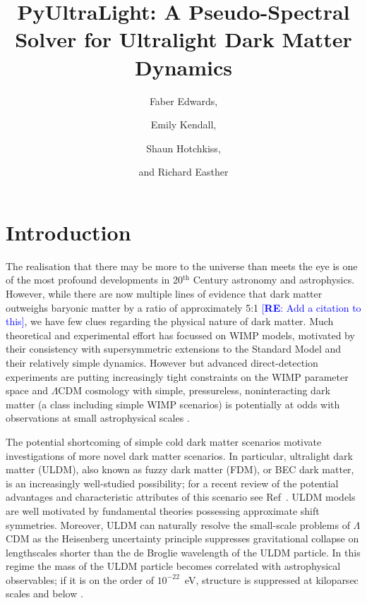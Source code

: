 \documentclass[a4paper,11pt]{article}
\title{ PyUltraLight: A Pseudo-Spectral Solver for Ultralight Dark Matter Dynamics}
\author[]{Faber Edwards,}
\author[]{Emily Kendall,}
\author[]{Shaun Hotchkiss,}
\author[]{and Richard Easther}
\affiliation[]{Department of Physics, University of Auckland, Private Bag 92019, Auckland, New Zealand}
\newcommand{\re}[1]{\textcolor{blue}{[{\bf RE}: #1]}}
\begin{document}
\maketitle
\flushbottom

\section{Introduction}
\label{sec:intro}

The realisation that there may be more to the universe than meets the eye is one of the most profound developments in 20$^{\textrm{th}}$ Century astronomy and astrophysics. However,  while there are now multiple lines of evidence that dark matter outweighs baryonic matter by a ratio of approximately 5:1 \re{Add a citation to this}, we have few clues regarding the physical nature of dark matter.  Much theoretical and experimental effort has focussed on  WIMP models, motivated by their consistency with supersymmetric extensions to the Standard Model and their relatively simple dynamics. However but advanced direct-detection experiments are putting increasingly tight constraints on the WIMP parameter space \cite{Tan2016, Akerib2017} and $\Lambda$CDM cosmology with simple, pressureless, noninteracting dark matter (a class  including simple WIMP scenarios) is potentially at odds with observations at small astrophysical scales \cite{Bull2016}.  

The potential shortcoming of simple cold dark matter scenarios   motivate  investigations of more novel dark matter scenarios. In particular, ultralight dark matter (ULDM), also known as fuzzy dark matter (FDM), or BEC dark matter, is an increasingly well-studied possibility; for a recent review of the potential advantages and characteristic attributes of this scenario see Ref~\cite{Hui2016}.   ULDM models are well motivated by fundamental theories possessing approximate shift symmetries. Moreover, ULDM can naturally resolve the small-scale problems of $\Lambda$CDM as the Heisenberg uncertainty principle suppresses gravitational collapse on lengthscales shorter than the de Broglie wavelength of the ULDM particle. In this regime the mass of the ULDM particle becomes correlated with astrophysical observables; if it is on the order of $10^{-22}$~eV, structure is suppressed at kiloparsec scales and below \cite{Hu2000}. 
\end{document}
